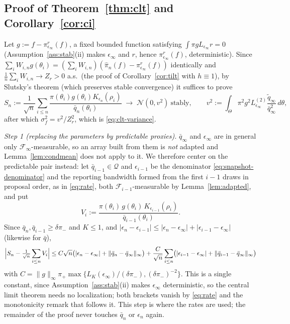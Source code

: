 \documentclass[10pt]{article}
\theoremstyle{plain}
\theoremstyle{definition}
\begin{document}
\subsection{Proof of Theorem~\ref{thm:clt} and Corollary~\ref{cor:ci}}\label{app:theory-clt}
Let $g:=f-\pi^r_{\epsilon_\infty}(f)$, a fixed bounded function satisfying $\int\pi gL_{\epsilon_\infty}r=0$ (Assumption~\ref{ass:stab}(ii) makes $\epsilon_\infty$ and $r$, hence $\pi^r_{\epsilon_\infty}(f)$, deterministic). Since $\sum_iW_{i,n}g(\theta_i)=(\sum_iW_{i,n})(\widehat\pi_n(f)-\pi^r_{\epsilon_\infty}(f))$ identically and $\tfrac1n\sum_iW_{i,n}\to Z_r>0$ a.s.\ (the proof of Corollary~\ref{cor:tilt} with $h\equiv1$), by Slutsky's theorem (which preserves stable convergence) it suffices to prove
\begin{equation}
S_n:=\frac{1}{\sqrt n}\sum_{i\le n}\frac{\pi(\theta_i)g(\theta_i)K_{\epsilon_n}(\rho_i)}{\bar q_n(\theta_i)}
\;\longrightarrow\;\mathcal{N}(0,v^2)\ \text{stably},
\qquad
v^2:=\int_\Theta\pi^2g^2L^{(2)}_{\epsilon_\infty}\frac{\tilde q_\infty}{\bar q^2_\infty}\,d\theta,
\label{eq:app-clt-target}
\end{equation}
after which $\sigma^2_f=v^2/Z^2_r$, which is \eqref{eq:clt-variance}.

\emph{Step 1 (replacing the parameters by predictable proxies).} $\bar q_\infty$ and $\epsilon_\infty$ are in general only $\mathcal{F}_\infty$-measurable, so an array built from them is \emph{not} adapted and Lemma~\ref{lem:condmean} does not apply to it. We therefore center on the predictable pair instead: let $\bar q_{i-1}\in\mathcal{Q}$ and $\epsilon_{i-1}$ be the denominator \eqref{eq:snapshot-denominator} and the reporting bandwidth formed from the first $i-1$ draws in proposal order, as in \eqref{eq:rate}, both $\mathcal{F}_{i-1}$-measurable by Lemma~\ref{lem:adapted}, and put
\[
V_i:=\frac{\pi(\theta_i)\,g(\theta_i)\,K_{\epsilon_{i-1}}(\rho_i)}{\bar q_{i-1}(\theta_i)} .
\]
Since $\bar q_n,\bar q_{i-1}\ge\delta\pi_-$ and $K\le1$, and $|\epsilon_n-\epsilon_{i-1}|\le|\epsilon_n-\epsilon_\infty|+|\epsilon_{i-1}-\epsilon_\infty|$ (likewise for $\bar q$),
\[
\Bigl|S_n-\tfrac{1}{\sqrt n}\sum_{i\le n}V_i\Bigr|
\le C\sqrt n\bigl(|\epsilon_n-\epsilon_\infty|+\|\bar q_n-\bar q_\infty\|_\infty\bigr)
+\frac{C}{\sqrt n}\sum_{i\le n}\bigl(|\epsilon_{i-1}-\epsilon_\infty|+\|\bar q_{i-1}-\bar q_\infty\|_\infty\bigr)
\]
with $C=\|g\|_\infty\pi_+\max\{L_K(\epsilon_\infty)/(\delta\pi_-),(\delta\pi_-)^{-2}\}$. This is a single constant, since Assumption~\ref{ass:stab}(ii) makes $\epsilon_\infty$ deterministic, so the central limit theorem needs no localization; both brackets vanish by \eqref{eq:rate} and the monotonicity remark that follows it. This step is where the rates are used; the remainder of the proof never touches $\bar q_n$ or $\epsilon_n$ again.
\end{document}
